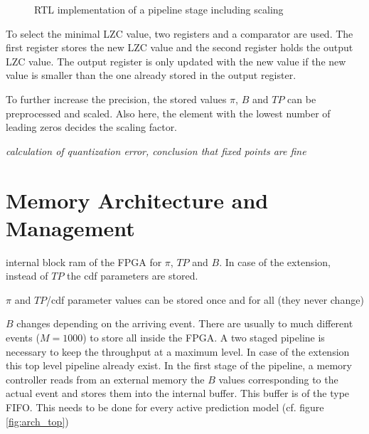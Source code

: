 \documentclass[mscthesis]{usiinfthesis}
\begin{document}
\begin{figure}
    \centering
    
    \caption{RTL implementation of a pipeline stage including scaling}
    \label{fig:arch_step_scale}
\end{figure}

To select the minimal LZC value, two registers and a comparator are used. The
first register stores the new LZC value and the second register holds the output
LZC value. The output register is only updated with the new value if the new
value is smaller than the one already stored in the output register.

To further increase the precision, the stored values $\pi$, $B$ and $TP$ can be
preprocessed and scaled. Also here, the element with the lowest number of
leading zeros decides the scaling factor.

\emph{\color{red}calculation of quantization error, conclusion that fixed points
are fine}

\section{Memory Architecture and Management}
\label{ch:design_mem}

internal block ram of the FPGA for $\pi$, $TP$ and $B$. In case of the extension,
instead of $TP$ the cdf parameters are stored.

$\pi$ and $TP$/cdf parameter values can be stored once and for all (they never
change)

$B$ changes depending on the arriving event. There are usually to much different
events ($M=1000$) to store all inside the FPGA. A two staged pipeline is
necessary to keep the throughput at a maximum level. In case of the extension
this top level pipeline already exist. In the first stage of the pipeline,
a memory controller reads from an external memory the $B$ values corresponding
to the actual event and stores them into the internal buffer. This buffer is of
the type FIFO. This needs to be done for every active prediction model (cf.
figure \ref{fig:arch_top})
\end{document}
